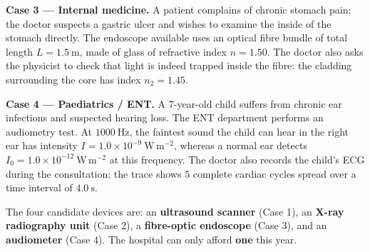 \documentclass[11pt]{article}
\newcounter{popsec}
\newcounter{popsub}
\newcommand{\courssub}[1]{%
  \stepcounter{popsub}%
  \par\vspace{9pt}\noindent{\popxbold\fontsize{11.5}{13}\selectfont\color{popink}{\color{poporange}\thepopsec.\thepopsub}\hspace{6pt}#1}\par\nopagebreak\vspace{4pt}
}
\begin{document}
\textbf{Case 3 --- Internal medicine.} A patient complains of chronic stomach pain; the doctor suspects a gastric ulcer and wishes to examine the inside of the stomach directly. The endoscope available uses an optical fibre bundle of total length $L = 1.5\ \mathrm{m}$, made of glass of refractive index $n = 1.50$. The doctor also asks the physicist to check that light is indeed trapped inside the fibre: the cladding surrounding the core has index $n_2 = 1.45$.

\textbf{Case 4 --- Paediatrics / ENT.} A 7-year-old child suffers from chronic ear infections and suspected hearing loss. The ENT department performs an audiometry test. At $1000\ \mathrm{Hz}$, the faintest sound the child can hear in the right ear has intensity $I = 1.0\times 10^{-9}\ \mathrm{W\,m^{-2}}$, whereas a normal ear detects $I_0 = 1.0\times 10^{-12}\ \mathrm{W\,m^{-2}}$ at this frequency. The doctor also records the child's ECG during the consultation: the trace shows $5$ complete cardiac cycles spread over a time interval of $4.0\ \mathrm{s}$.

The four candidate devices are: an \textbf{ultrasound scanner} (Case 1), an \textbf{X-ray radiography unit} (Case 2), a \textbf{fibre-optic endoscope} (Case 3), and an \textbf{audiometer} (Case 4). The hospital can only afford \textbf{one} this year.

\courssub{Tasks}
\end{document}
